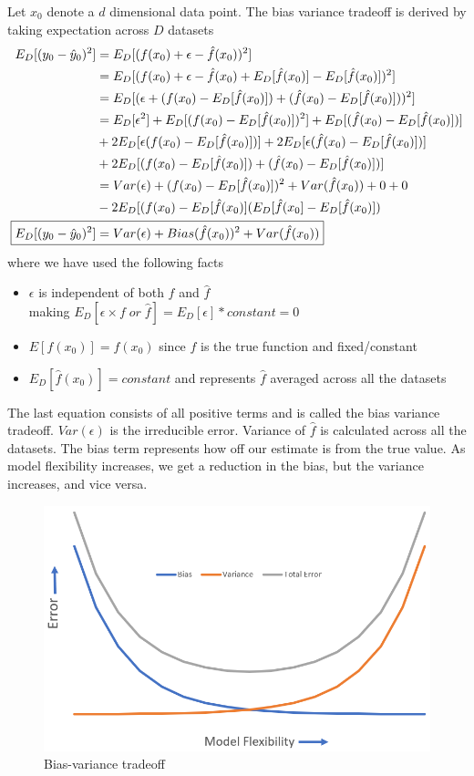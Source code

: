 \documentclass[../../statistical_learning_notes.tex]{subfiles}
\begin{document}
Let $x_{0}$ denote a $d$ dimensional data point. The bias variance tradeoff is derived by taking expectation across $D$ datasets
\begin{align*}
    E_{D}[(y_{0} - \hat{y}_{0})^{2}] &= E_{D}[(f(x_{0}) + \epsilon - \hat{f}(x_{0}))^{2}]\\
     &= E_{D}[(f(x_{0}) + \epsilon - \hat{f}(x_{0}) + E_{D}[\hat{f}(x_{0})] - E_{D}[\hat{f}(x_{0})])^{2}]\\
    &= E_{D}[(\epsilon + (f(x_{0}) - E_{D}[\hat{f}(x_{0})]) + (\hat{f}(x_{0}) - E_{D}[\hat{f}(x_{0})]))^{2}]\\
    &= E_{D}[\epsilon^{2}] + E_{D}[(f(x_{0}) - E_{D}[\hat{f}(x_{0})])^{2}] + E_{D}[(\hat{f}(x_{0}) - E_{D}[\hat{f}(x_{0})])]\\ &+ 2E_{D}[\epsilon(f(x_{0}) - E_{D}[\hat{f}(x_{0})])] + 2E_{D}[\epsilon (\hat{f}(x_{0}) - E_{D}[\hat{f}(x_{0})])] \\ &+ 2E_{D}[(f(x_{0}) - E_{D}[\hat{f}(x_{0})]) + (\hat{f}(x_{0}) - E_{D}[\hat{f}(x_{0})])]\\
    &= Var(\epsilon) + (f(x_{0}) - E_{D}[\hat{f}(x_{0})])^{2} + Var(\hat{f}(x_{0})) + 0 + 0\\ &- 2E_{D}[(f(x_{0}) - E_{D}[\hat{f}(x_{0})](E_{D}[\hat{f}(x_{0}] - E_{D}[\hat{f}(x_{0})])\\
    \Aboxed{E_{D}[(y_{0} - \hat{y}_{0})^{2}] &= Var(\epsilon) + Bias(\hat{f}(x_{0}))^{2} + Var(\hat{f}(x_{0}))}
\end{align*}
where we have used the following facts
\begin{itemize}
    \item $\epsilon$ is independent of both $f$ and $\hat{f}$\\making $E_{D}[\epsilon \times f \;or\; \hat{f}] = E_{D}[\epsilon] * constant = 0$
    \item $E[f(x_{0})] = f(x_{0})$ since $f$ is the true function and fixed/constant
    \item $E_{D}[\hat{f}(x_{0})] = constant$ and represents $\hat{f}$ averaged across all the datasets
\end{itemize}

The last equation consists of all positive terms and is called the bias variance tradeoff. $Var(\epsilon)$ is the irreducible error. Variance of $\hat{f}$ is calculated across all the datasets. The bias term represents how off our estimate is from the true value. As model flexibility increases, we get a reduction in the bias, but the variance increases, and vice versa.

\begin{figure}[h]
    \includegraphics[scale=0.5]{../images/bias_variance}
    \centering
    \caption {Bias-variance tradeoff}
    \label{fig:bias_variance} %
\end{figure}
\end{document}
